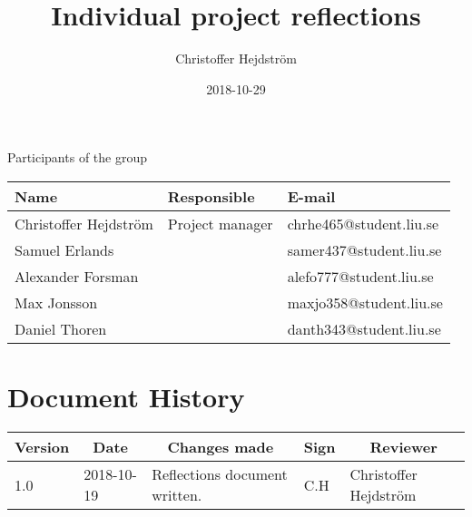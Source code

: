 \documentclass[10pt,oneside,english]{lips}
\title{Individual project reflections}
\author{Christoffer Hejdström}
\date{2018-10-29}
\begin{document}
  \setlength\parindent{0pt}
  \maketitle
  
  \cleardoublepage
  \makeprojectid
  
  \begin{center}
    \Large Participants of the group
  \end{center}
  \begin{center}
    \begin{tabular}{|l|l|l|}
      \hline
      \textbf{Name} & \textbf{Responsible} & \textbf{E-mail}\\ \hline
      Christoffer Hejdström & Project manager & chrhe465@student.liu.se \\ \hline
      Samuel Erlands & & samer437@student.liu.se \\ \hline
      Alexander Forsman & & alefo777@student.liu.se\\ \hline
      Max Jonsson & & maxjo358@student.liu.se\\ \hline
      Daniel Thoren & & danth343@student.liu.se\\
      \hline
    \end{tabular}
  \end{center}
  
  
  \cleardoublepage
  \tableofcontents
  
  \cleardoublepage
  \section*{Document History}
  \begin{tabular}{p{}|p{}|p{}|p{}|p{}} 
    \multicolumn{1}{c}{\bfseries Version} & 
    \multicolumn{1}{|c}{\bfseries Date} & 
    \multicolumn{1}{|c}{\bfseries Changes made} & 
    \multicolumn{1}{|c}{\bfseries Sign} & 
    \multicolumn{1}{|c}{\bfseries Reviewer}\\
    \hline
    \hline
    1.0 & 2018-10-19 & Reflections document written. & C.H & Christoffer Hejdström \\ \hline
  \end{tabular}
  
  \cleardoublepage
  \cfoot{\thepage}
  
    
  
  
  
  
  \clearpage
  \cleardoublepage
  \appendix
  
  
\end{document}
